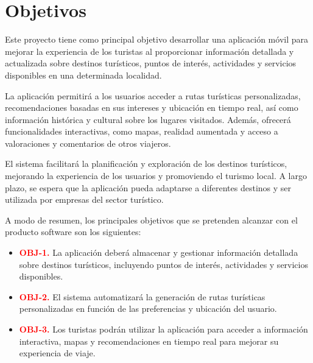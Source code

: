 \chapter{Objetivos}
Este proyecto tiene como principal objetivo desarrollar una aplicación móvil
para mejorar la experiencia de los turistas al proporcionar información
detallada y actualizada sobre destinos turísticos, puntos de interés,
actividades y servicios disponibles en una determinada localidad.

La aplicación permitirá a los usuarios acceder a rutas turísticas
personalizadas, recomendaciones basadas en sus intereses y ubicación en tiempo
real, así como información histórica y cultural sobre los lugares visitados.
Además, ofrecerá funcionalidades interactivas, como mapas, realidad aumentada y
acceso a valoraciones y comentarios de otros viajeros.

El sistema facilitará la planificación y exploración de los destinos turísticos,
mejorando la experiencia de los usuarios y promoviendo el turismo local. A
largo plazo, se espera que la aplicación pueda adaptarse a diferentes destinos y
ser utilizada por empresas del sector turístico.

A modo de resumen, los principales objetivos que se pretenden alcanzar con el
producto software son los siguientes:

\begin{itemize} 
    
\item \textbf{\textcolor{red}{OBJ-1.}} La aplicación deberá almacenar y
gestionar información detallada sobre destinos turísticos, incluyendo puntos de
interés, actividades y servicios disponibles. 

\item \textbf{\textcolor{red}{OBJ-2.}} El sistema
automatizará la generación de rutas turísticas personalizadas en función de las
preferencias y ubicación del usuario. 

\item \textbf{\textcolor{red}{OBJ-3.}} Los turistas podrán
utilizar la aplicación para acceder a información interactiva, mapas y
recomendaciones en tiempo real para mejorar su experiencia de viaje.

\end{itemize}